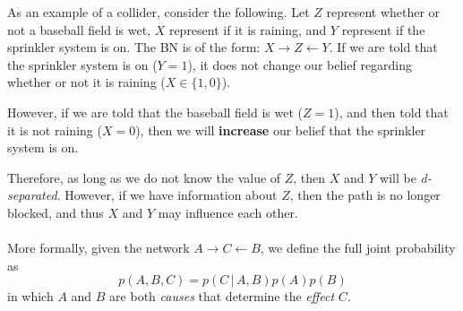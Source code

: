 \documentclass{article}
\begin{document}
\noindent As an example of a collider, consider the following. Let $Z$ represent whether or not a baseball field is wet, $X$ represent if it is raining, and $Y$ represent if the sprinkler system is on. The BN is of the form: $X \rightarrow Z \leftarrow Y$. If we are told that the sprinkler system is on ($Y=1$), it does not change our belief regarding whether or not it is raining ($X \in \{1, 0\}$). 

However, if we are told that the baseball field is wet ($Z=1$), and then told that it is not raining ($X=0$), then we will \textbf{increase} our belief that the sprinkler system is on. 

Therefore, as long as we do not know the value of $Z$, then $X$ and $Y$ will be \textit{d-separated}. However, if we have information about $Z$, then the path is no longer blocked, and thus $X$ and $Y$ may influence each other. 
\\
\\
\noindent More formally, given the network $A \rightarrow C \leftarrow B$, we define the full joint probability as 
$$
    p(A, B, C) = p(C \,|\, A, B) p(A) p(B)
$$
in which $A$ and $B$ are both \textit{causes} that determine the \textit{effect} $C$.

\begin{center}
\end{center}
\end{document}
